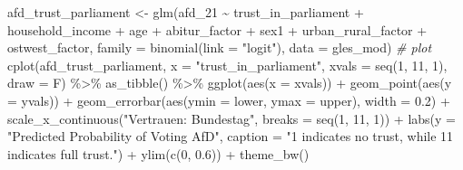 \documentclass[
]{article}
\newenvironment{Shaded}{\begin{snugshade}}{\end{snugshade}}
\newcommand{\AttributeTok}[1]{\textcolor[rgb]{0.77,0.63,0.00}{#1}}
\newcommand{\CommentTok}[1]{\textcolor[rgb]{0.56,0.35,0.01}{\textit{#1}}}
\newcommand{\DecValTok}[1]{\textcolor[rgb]{0.00,0.00,0.81}{#1}}
\newcommand{\FloatTok}[1]{\textcolor[rgb]{0.00,0.00,0.81}{#1}}
\newcommand{\FunctionTok}[1]{\textcolor[rgb]{0.00,0.00,0.00}{#1}}
\newcommand{\NormalTok}[1]{#1}
\newcommand{\OtherTok}[1]{\textcolor[rgb]{0.56,0.35,0.01}{#1}}
\newcommand{\SpecialCharTok}[1]{\textcolor[rgb]{0.00,0.00,0.00}{#1}}
\newcommand{\StringTok}[1]{\textcolor[rgb]{0.31,0.60,0.02}{#1}}
\begin{document}
\begin{Shaded}
\begin{Highlighting}[]
\NormalTok{afd\_trust\_parliament }\OtherTok{\textless{}{-}} \FunctionTok{glm}\NormalTok{(afd\_21 }\SpecialCharTok{\textasciitilde{}}\NormalTok{ trust\_in\_parliament }\SpecialCharTok{+}\NormalTok{ household\_income }\SpecialCharTok{+}\NormalTok{ age }\SpecialCharTok{+}\NormalTok{ abitur\_factor }\SpecialCharTok{+}\NormalTok{ sex1 }\SpecialCharTok{+}\NormalTok{ urban\_rural\_factor }\SpecialCharTok{+}\NormalTok{ ostwest\_factor, }\AttributeTok{family =} \FunctionTok{binomial}\NormalTok{(}\AttributeTok{link =} \StringTok{"logit"}\NormalTok{), }\AttributeTok{data =}\NormalTok{ gles\_mod)}
\CommentTok{\# plot }
\FunctionTok{cplot}\NormalTok{(afd\_trust\_parliament, }\AttributeTok{x =} \StringTok{"trust\_in\_parliament"}\NormalTok{,}
      \AttributeTok{xvals =} \FunctionTok{seq}\NormalTok{(}\DecValTok{1}\NormalTok{, }\DecValTok{11}\NormalTok{, }\DecValTok{1}\NormalTok{), }\AttributeTok{draw =}\NormalTok{ F)  }\SpecialCharTok{\%\textgreater{}\%}
  \FunctionTok{as\_tibble}\NormalTok{() }\SpecialCharTok{\%\textgreater{}\%}
  \FunctionTok{ggplot}\NormalTok{(}\FunctionTok{aes}\NormalTok{(}\AttributeTok{x =}\NormalTok{ xvals)) }\SpecialCharTok{+}
  \FunctionTok{geom\_point}\NormalTok{(}\FunctionTok{aes}\NormalTok{(}\AttributeTok{y =}\NormalTok{ yvals)) }\SpecialCharTok{+}
  \FunctionTok{geom\_errorbar}\NormalTok{(}\FunctionTok{aes}\NormalTok{(}\AttributeTok{ymin =}\NormalTok{ lower, }\AttributeTok{ymax =}\NormalTok{ upper), }\AttributeTok{width =} \FloatTok{0.2}\NormalTok{) }\SpecialCharTok{+}
  \FunctionTok{scale\_x\_continuous}\NormalTok{(}\StringTok{"Vertrauen: Bundestag"}\NormalTok{, }
                     \AttributeTok{breaks =} \FunctionTok{seq}\NormalTok{(}\DecValTok{1}\NormalTok{, }\DecValTok{11}\NormalTok{, }\DecValTok{1}\NormalTok{)) }\SpecialCharTok{+}
  \FunctionTok{labs}\NormalTok{(}\AttributeTok{y =} \StringTok{"Predicted Probability of Voting AfD"}\NormalTok{, }
       \AttributeTok{caption =} \StringTok{"\textquotesingle{}1\textquotesingle{} indicates \textquotesingle{}no trust\textquotesingle{}, while 11 indicates \textquotesingle{}full trust\textquotesingle{}."}\NormalTok{) }\SpecialCharTok{+}
  \FunctionTok{ylim}\NormalTok{(}\FunctionTok{c}\NormalTok{(}\DecValTok{0}\NormalTok{, }\FloatTok{0.6}\NormalTok{)) }\SpecialCharTok{+}
  \FunctionTok{theme\_bw}\NormalTok{()}
\end{Highlighting}
\end{Shaded}
\end{document}

